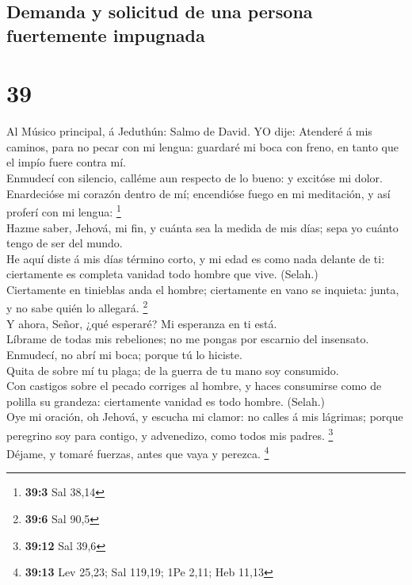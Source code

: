 \hypertarget{demanda-y-solicitud-de-una-persona-fuertemente-impugnada}{%
\subsection{Demanda y solicitud de una persona fuertemente
impugnada}\label{demanda-y-solicitud-de-una-persona-fuertemente-impugnada}}

\hypertarget{section-38}{%
\section{39}\label{section-38}}

 Al Músico principal, á Jeduthún: Salmo de David. YO dije:
Atenderé á mis caminos, para no pecar con mi lengua: guardaré mi boca
con freno, en tanto que el impío fuere contra mí.\\
 Enmudecí con silencio, calléme aun respecto de lo bueno:
y excitóse mi dolor.\\
 Enardecióse mi corazón dentro de mí; encendióse fuego en
mi meditación, y así proferí con mi lengua: \footnote{\textbf{39:3} Sal
  38,14}\\
 Hazme saber, Jehová, mi fin, y cuánta sea la medida de
mis días; sepa yo cuánto tengo de ser del mundo.\\
 He aquí diste á mis días término corto, y mi edad es como
nada delante de ti: ciertamente es completa vanidad todo hombre que
vive. (Selah.)\\
 Ciertamente en tinieblas anda el hombre; ciertamente en
vano se inquieta: junta, y no sabe quién lo allegará. \footnote{\textbf{39:6}
  Sal 90,5}\\
 Y ahora, Señor, ¿qué esperaré? Mi esperanza en ti está.\\
 Líbrame de todas mis rebeliones; no me pongas por
escarnio del insensato.\\
 Enmudecí, no abrí mi boca; porque tú lo hiciste.\\
 Quita de sobre mí tu plaga; de la guerra de tu mano soy
consumido.\\
 Con castigos sobre el pecado corriges al hombre, y haces
consumirse como de polilla su grandeza: ciertamente vanidad es todo
hombre. (Selah.)\\
 Oye mi oración, oh Jehová, y escucha mi clamor: no
calles á mis lágrimas; porque peregrino soy para contigo, y advenedizo,
como todos mis padres. \footnote{\textbf{39:12} Sal 39,6}\\
 Déjame, y tomaré fuerzas, antes que vaya y perezca.
\footnote{\textbf{39:13} Lev 25,23; Sal 119,19; 1Pe 2,11; Heb 11,13}

